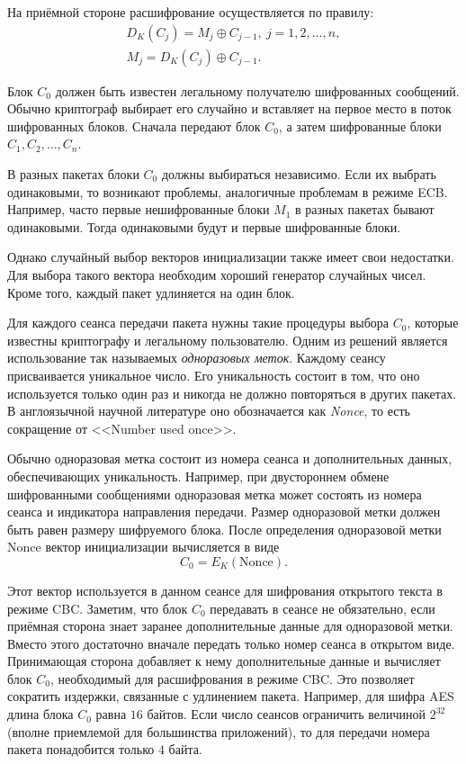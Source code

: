 На приёмной стороне расшифрование осуществляется по правилу:
\[ \begin{array}{l}
    D_K(C_j) = M_j \oplus C_{j-1}, ~ j=1, 2, \dots, n,\\
    M_{j} = D_K(C_j) \oplus C_{j-1}.
\end{array} \]

Блок $C_0$ должен быть известен легальному получателю шифрованных сообщений. Обычно криптограф выбирает его случайно и вставляет на первое место в поток шифрованных блоков. Сначала передают блок $C_0$, а затем шифрованные блоки $C_1, C_2, \ldots, C_n$.

В разных пакетах блоки $C_0$ должны выбираться независимо. Если их выбрать одинаковыми, то возникают проблемы, аналогичные проблемам в режиме ECB. Например, часто первые нешифрованные блоки $M_1$ в разных пакетах бывают одинаковыми. Тогда одинаковыми будут и первые шифрованные блоки.

Однако случайный выбор векторов инициализации также имеет свои недостатки. Для выбора такого вектора необходим хороший генератор случайных чисел. Кроме того, каждый пакет удлиняется на один блок.

Для каждого сеанса передачи пакета нужны такие процедуры выбора $C_0$, которые известны криптографу и легальному пользователю. Одним из решений является использование так называемых \emph{одноразовых меток}. Каждому сеансу присваивается уникальное число. Его уникальность состоит в том, что оно используется только один раз и никогда не должно повторяться в других пакетах. В англоязычной научной литературе оно обозначается как \emph{Nonce}, то есть сокращение от <<Number used once>>.

Обычно одноразовая метка состоит из номера сеанса и дополнительных данных, обеспечивающих уникальность. Например, при двустороннем обмене шифрованными сообщениями одноразовая метка может состоять из номера сеанса и индикатора направления передачи. Размер одноразовой метки должен быть равен размеру шифруемого блока. После определения одноразовой метки $\textrm{Nonce}$ вектор инициализации вычисляется в виде
    \[ C_0 = E_K(\textrm{Nonce}). \]

Этот вектор используется в данном сеансе для шифрования открытого текста в режиме CBC. Заметим, что блок $C_0$ передавать в сеансе не обязательно, если приёмная сторона знает заранее дополнительные данные для одноразовой метки. Вместо этого достаточно вначале передать только номер сеанса в открытом виде. Принимающая сторона добавляет к нему дополнительные данные и вычисляет блок $C_0$, необходимый для расшифрования в режиме CBC. Это позволяет сократить издержки, связанные с удлинением пакета. Например, для шифра AES длина блока $C_0$ равна $16$ байтов. Если число сеансов ограничить величиной $2^{32}$ (вполне приемлемой для большинства приложений), то для передачи номера пакета понадобится только $4$ байта.


